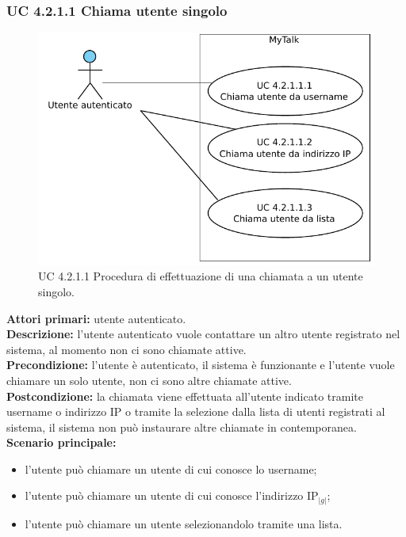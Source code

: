 \newpage

\subsubsection{UC 4.2.1.1 Chiama utente singolo}

\begin{figure}[htbp]
\centering
\includegraphics[scale=0.7]{./casi_uso/UC4-2-1-1.pdf}
\caption{UC 4.2.1.1 Procedura di effettuazione di una chiamata a un utente singolo.}
\end{figure}

\noindent
\textbf{Attori primari:} utente autenticato.\\
\textbf{Descrizione:} l'utente autenticato vuole contattare un altro utente registrato nel sistema, al momento non ci sono chiamate attive.\\
\textbf{Precondizione:} l'utente è autenticato, il sistema è funzionante e l'utente vuole chiamare un solo utente, non ci sono altre chiamate attive.\\
\textbf{Postcondizione:} la chiamata viene effettuata all'utente indicato tramite username o indirizzo IP o tramite la selezione dalla lista di utenti registrati al sistema, il sistema non può instaurare altre chiamate in contemporanea.\\
\textbf{Scenario principale:}
\begin{itemize}
\item l'utente può chiamare un utente di cui conosce lo username;
\item l'utente può chiamare un utente di cui conosce l'indirizzo IP$_{|g|}$;
\item l'utente può chiamare un utente selezionandolo tramite una lista.
\end{itemize}

